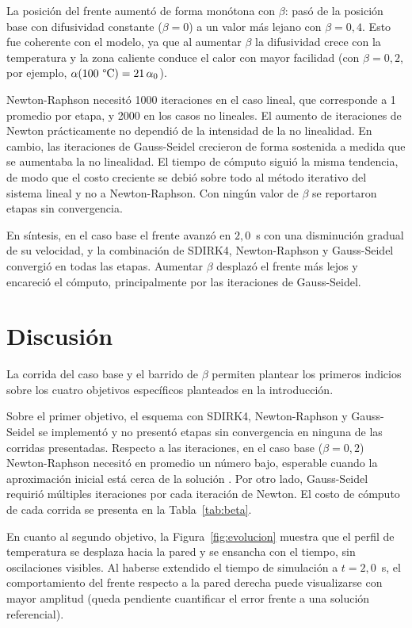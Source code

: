 \documentclass[final,5p,times,twocolumn,authoryear,11pt]{elsarticle}
\begin{document}
La posición del frente aumentó de forma monótona con $\beta$: pasó de la posición base con difusividad constante ($\beta=0$) a un valor más lejano con $\beta=0{,}4$. Esto fue coherente con el modelo, ya que al aumentar $\beta$ la difusividad crece con la temperatura y la zona caliente conduce el calor con mayor facilidad (con $\beta=0{,}2$, por ejemplo, $\alpha(100~\text{\textdegree C})=21\,\alpha_0$).

Newton-Raphson necesitó 1000 iteraciones en el caso lineal, que corresponde a 1 promedio por etapa, y 2000 en los casos no lineales. El aumento de iteraciones de Newton prácticamente no dependió de la intensidad de la no linealidad. En cambio, las iteraciones de Gauss-Seidel crecieron de forma sostenida a medida que se aumentaba la no linealidad. El tiempo de cómputo siguió la misma tendencia, de modo que el costo creciente se debió sobre todo al método iterativo del sistema lineal y no a Newton-Raphson. Con ningún valor de $\beta$ se reportaron etapas sin convergencia.

En síntesis, en el caso base el frente avanzó en $2{,}0$~s con una disminución gradual de su velocidad, y la combinación de SDIRK4, Newton-Raphson y Gauss-Seidel convergió en todas las etapas. Aumentar $\beta$ desplazó el frente más lejos y encareció el cómputo, principalmente por las iteraciones de Gauss-Seidel.

\section{Discusión}
La corrida del caso base y el barrido de $\beta$ permiten plantear los
primeros indicios sobre los cuatro objetivos específicos planteados en la
introducción.

Sobre el primer objetivo, el esquema con SDIRK4, Newton-Raphson y
Gauss-Seidel se implementó y no presentó etapas sin convergencia en ninguna de las corridas presentadas. Respecto a las iteraciones, en el caso base ($\beta=0{,}2$) Newton-Raphson necesitó en promedio un número bajo, esperable cuando la aproximación inicial está cerca de la solución \citep{Deuflhard1974}. Por otro lado, Gauss-Seidel requirió múltiples iteraciones por cada iteración de Newton. El costo de cómputo de cada corrida se presenta en la Tabla~\ref{tab:beta}.

En cuanto al segundo objetivo, la Figura~\ref{fig:evolucion} muestra que el
perfil de temperatura se desplaza hacia la pared y se ensancha con el tiempo,
sin oscilaciones visibles. Al haberse extendido el tiempo de simulación a $t=2{,}0$~s, el comportamiento del frente respecto a la pared derecha puede visualizarse con mayor amplitud (queda pendiente cuantificar el error frente a una solución referencial).
\end{document}
